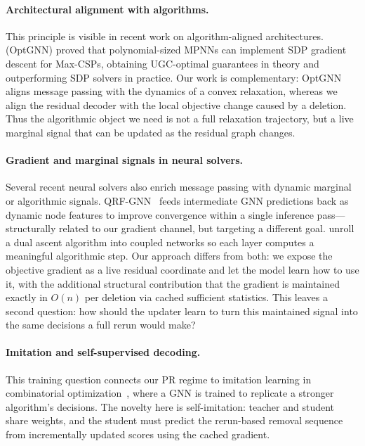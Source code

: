 \documentclass[11pt]{article}
\theoremstyle{plain}
\theoremstyle{remark}
\begin{document}
\paragraph{Architectural alignment with algorithms.}
This principle is visible in recent work on algorithm-aligned architectures.
\citet{yau2023} (OptGNN) proved that polynomial-sized MPNNs can implement SDP
gradient descent for Max-CSPs, obtaining UGC-optimal guarantees in theory and
outperforming SDP solvers in practice. Our work is complementary: OptGNN aligns
message passing with the dynamics of a convex relaxation, whereas we align the
residual decoder with the local objective change caused by a deletion. Thus the
algorithmic object we need is not a full relaxation trajectory, but a live marginal
signal that can be updated as the residual graph changes.

\paragraph{Gradient and marginal signals in neural solvers.}
Several recent neural solvers also enrich message passing with dynamic marginal or
algorithmic signals. QRF-GNN~\citep{gaile2024} feeds intermediate GNN predictions
back as dynamic node features to improve convergence within a single inference
pass---structurally related to our gradient channel, but targeting a different goal.
\citet{hadou2024} unroll a dual ascent algorithm into coupled networks so each layer
computes a meaningful algorithmic step. Our approach differs from both: we expose the
objective gradient as a live residual coordinate and let the model learn how to use
it, with the additional structural contribution that the gradient is maintained
exactly in $O(n)$ per deletion via cached sufficient statistics. This leaves a second
question: how should the updater learn to turn this maintained signal into the same
decisions a full rerun would make?

\paragraph{Imitation and self-supervised decoding.}
This training question connects our PR regime to imitation learning in combinatorial
optimization~\citep{liu2021}, where a GNN is trained to replicate a stronger
algorithm's decisions. The novelty here is self-imitation: teacher and student share
weights, and the student must predict the rerun-based removal sequence from
incrementally updated scores using the cached gradient.
\end{document}
